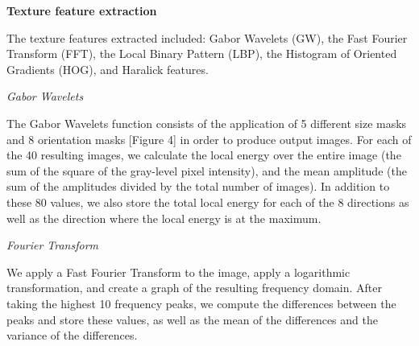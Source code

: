 \textbf{Texture feature extraction}


The texture features extracted included: Gabor Wavelets (GW), the Fast Fourier Transform (FFT), the Local Binary Pattern (LBP), the Histogram of Oriented Gradients (HOG), and Haralick features.

    \textit{Gabor Wavelets}

The Gabor Wavelets function consists of the application of 5 different size masks and 8 orientation masks [Figure 4] in order to produce output images. For each of the 40 resulting images, we calculate the local energy over the entire image (the sum of the square of the gray-level pixel intensity), and the mean amplitude (the sum of the amplitudes divided by the total number of images). In addition to these 80 values, we also store the total local energy for each of the 8 directions as well as the direction where the local energy is at the maximum.

    \textit{Fourier Transform}

We apply a Fast Fourier Transform to the image, apply a logarithmic transformation, and create a graph of the resulting frequency domain. After taking the highest 10 frequency peaks, we compute the differences between the peaks and store these values, as well as the mean of the differences and the variance of the differences. 

    
    
    
    
    
  
  
  
  
